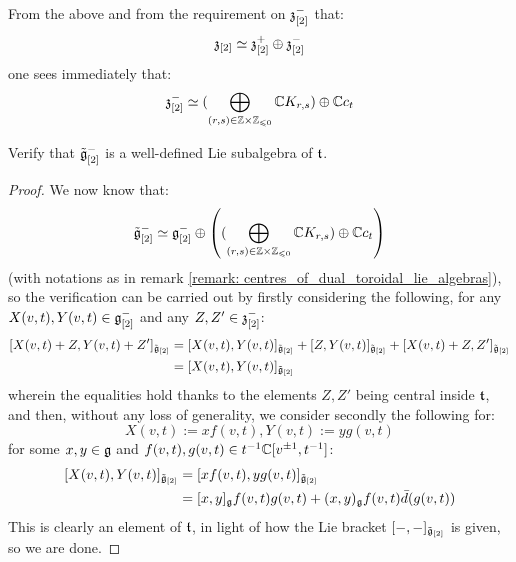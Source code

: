\begin{remark}
            From the above and from the requirement on $\mathfrak{z}_{[2]}^-$ that:
                $$\mathfrak{z}_{[2]} \simeq \mathfrak{z}_{[2]}^+ \oplus \mathfrak{z}_{[2]}^-$$
            one sees immediately that:
                $$\z_{[2]}^- \cong ( \bigoplus_{(r, s) \in \Z \x \Z_{\leq 0}} \bbC K_{r, s}) \oplus \bbC c_t$$
        \end{remark}
        \begin{question} \label{question: toroidal_dual}
            Verify that $\tilde{\mathfrak{g}}_{[2]}^-$ is a well-defined Lie subalgebra of $\mathfrak{t}$.
        \end{question}
            \begin{proof}
                We now know that:
                    $$\tilde{\g}_{[2]}^- \cong \g_{[2]}^- \oplus \left( ( \bigoplus_{(r, s) \in \Z \x \Z_{\leq 0}} \bbC K_{r, s}) \oplus \bbC c_t \right)$$
                (with notations as in remark \ref{remark: centres_of_dual_toroidal_lie_algebras}), so the verification can be carried out by firstly considering the following, for any $X(v, t), Y(v, t) \in \mathfrak{g}_{[2]}^-$ and any $Z, Z' \in \mathfrak{z}_{[2]}^-$:
                    $$
                        \begin{aligned}
                            [ X(v, t) + Z, Y(v, t) + Z' ]_{\tilde{\g}_{[2]}} & = [ X(v, t), Y(v, t) ]_{\tilde{\g}_{[2]}} + [ Z, Y(v, t) ]_{\tilde{\g}_{[2]}} + [X(v, t) + Z, Z']_{\tilde{\g}_{[2]}}
                            \\
                            & = [ X(v, t), Y(v, t) ]_{\tilde{\g}_{[2]}}
                        \end{aligned}
                    $$
                wherein the equalities hold thanks to the elements $Z, Z'$ being central inside $\mathfrak{t}$, and then, without any loss of generality, we consider secondly the following for:
                    $$X(v, t) := x f(v, t), Y(v, t) := y g(v, t)$$
                for some $x, y \in \mathfrak{g}$ and $f(v, t), g(v, t) \in t^{-1}\mathbb{C}[v^{\pm 1}, t^{-1}]$:
                    $$
                        \begin{aligned}
                            [ X(v, t), Y(v, t) ]_{\tilde{\g}_{[2]}} & = [ x f(v, t), y g(v, t) ]_{\tilde{\g}_{[2]}}
                            \\
                            & = [x, y]_{\g} f(v, t) g(v, t) + (x, y)_{\g} f(v, t) \bar{d}( g(v, t) )
                        \end{aligned}
                    $$
                This is clearly an element of $\mathfrak{t}$, in light of how the Lie bracket $[-, -]_{\tilde{\mathfrak{g}}_{[2]}}$ is given, so we are done. 
            \end{proof}

